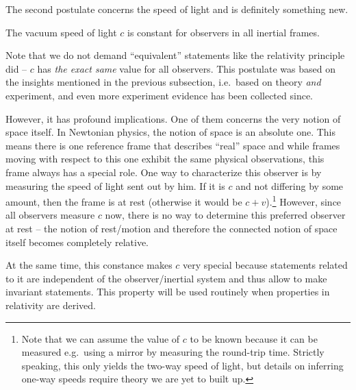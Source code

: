 The second postulate concerns the speed of light and is definitely something new.
\begin{post}\label{post:c_constant}
	The vacuum speed of light $c$ is constant for observers in all inertial frames.
\end{post}
Note that we do not demand \enquote{equivalent} statements like the relativity principle did -- $c$ has \emph{the exact same} value for all observers. This postulate was based on the insights mentioned in the previous subsection, i.e.~based on theory \emph{and} experiment, and even more experiment evidence has been collected since.

However, it has profound implications. One of them concerns the very notion of space itself. In Newtonian physics, the notion of space is an absolute one. This means there is one reference frame that describes \enquote{real} space and while frames moving with respect to this one exhibit the same physical observations, this frame always has a special role. One way to characterize this observer is by measuring the speed of light sent out by him. If it is $c$ and not differing by some amount, then the frame is at rest (otherwise it would be $c + v$).\footnote{Note that we can assume the value of $c$ to be known because it can be measured e.g.~using a mirror by measuring the round-trip time. Strictly speaking, this only yields the two-way speed of light, but details on inferring one-way speeds require theory we are yet to built up.} However, since all observers measure $c$ now, there is no way to determine this preferred observer at rest -- the notion of rest/motion and therefore the connected notion of space itself becomes completely relative.


At the same time, this constance makes $c$ very special because statements related to it are independent of the observer/inertial system and thus allow to make invariant statements. This property will be used routinely when properties in relativity are derived.\\



